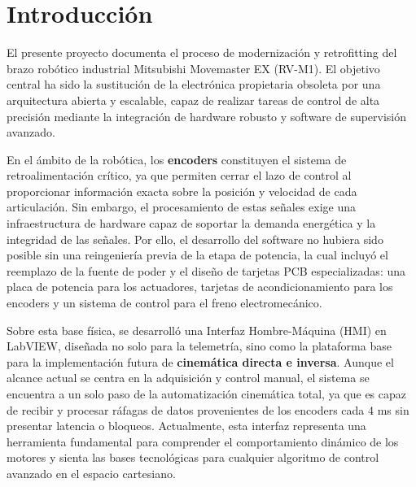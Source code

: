 \section{Introducción}

El presente proyecto documenta el proceso de modernización y retrofitting del brazo robótico industrial Mitsubishi Movemaster EX (RV-M1). El objetivo central ha sido la sustitución de la electrónica propietaria obsoleta por una arquitectura abierta y escalable, capaz de realizar tareas de control de alta precisión mediante la integración de hardware robusto y software de supervisión avanzado.

En el ámbito de la robótica, los \textbf{encoders} constituyen el sistema de retroalimentación crítico, ya que permiten cerrar el lazo de control al proporcionar información exacta sobre la posición y velocidad de cada articulación. Sin embargo, el procesamiento de estas señales exige una infraestructura de hardware capaz de soportar la demanda energética y la integridad de las señales. Por ello, el desarrollo del software no hubiera sido posible sin una reingeniería previa de la etapa de potencia, la cual incluyó el reemplazo de la fuente de poder y el diseño de tarjetas PCB especializadas: una placa de potencia para los actuadores, tarjetas de acondicionamiento para los encoders y un sistema de control para el freno electromecánico.

Sobre esta base física, se desarrolló una Interfaz Hombre-Máquina (HMI) en LabVIEW, diseñada no solo para la telemetría, sino como la plataforma base para la implementación futura de \textbf{cinemática directa e inversa}. Aunque el alcance actual se centra en la adquisición y control manual, el sistema se encuentra a un solo paso de la automatización cinemática total, ya que es capaz de recibir y procesar ráfagas de datos provenientes de los encoders cada 4 ms sin presentar latencia o bloqueos. Actualmente, esta interfaz representa una herramienta fundamental para comprender el comportamiento dinámico de los motores y sienta las bases tecnológicas para cualquier algoritmo de control avanzado en el espacio cartesiano.